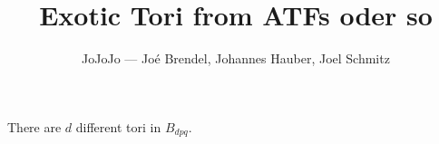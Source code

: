 \documentclass[11pt,a4paper,draft]{scrartcl}
\begin{document}
\title{Exotic Tori from ATFs oder so}
\author{JoJoJo — Joé Brendel, Johannes Hauber, Joel Schmitz}

\maketitle

\begin{theorem}
There are $d$ different tori in $B_{dpq}$.
\end{theorem}
\end{document}
